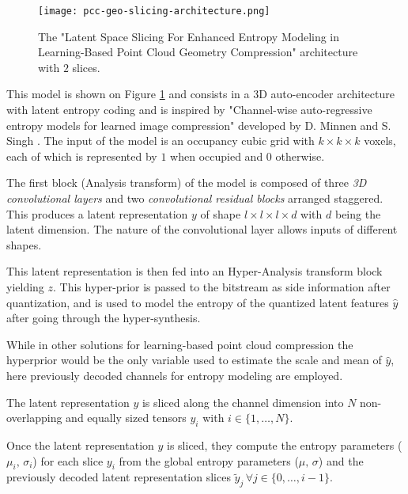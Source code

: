 \begin{figure}[htb]
    \centering
    \texttt{[image: pcc-geo-slicing-architecture.png]}
    \caption{The "Latent Space Slicing For Enhanced Entropy Modeling in Learning-Based Point Cloud Geometry Compression" architecture with $2$ slices.}
    \label{fig:pcc-geo-slicing-architecture}
\end{figure}

This model is shown on Figure \ref{fig:pcc-geo-slicing-architecture} and consists in a 3D auto-encoder architecture with latent entropy coding and is inspired by "Channel-wise auto-regressive entropy models for learned image compression" developed by D. Minnen and S. Singh \cite{bib:2d-pcc-slicing}. 
The input of the model is an occupancy cubic grid with $k \times k \times k$ voxels, each of which is represented by $1$ when occupied and $0$ otherwise. 


The first block (Analysis transform) of the model is composed of three \textit{3D convolutional layers} and two \textit{convolutional residual blocks} arranged staggered. This produces a latent representation $y$ of shape $l \times l \times l \times d$ with $d$ being the latent dimension. The nature of the convolutional layer allows inputs of different shapes. 

This latent representation is then fed into an Hyper-Analysis transform block yielding $z$. This hyper-prior is passed to the bitstream as side information after quantization, and is used to model the entropy of the quantized latent features $\hat{y}$ after going through the hyper-synthesis. 

While in other solutions for learning-based point cloud compression the hyperprior would be the only variable used to estimate the scale and mean of $\hat{y}$, here previously decoded channels for entropy modeling are employed.

The latent representation $y$ is sliced along the channel dimension into $N$ non-overlapping and equally sized tensors $y_i$ with $i \in \{1, \dots, N\}$. 

Once the latent representation $y$ is sliced, they compute the entropy parameters ($\mu_i,\,\sigma_i$) for each slice $y_i$ from the global entropy parameters ($\mu,\,\sigma$) and the previously decoded latent representation slices $\tilde{y}_j\,\forall j \in \{0,\dots,i-1\}$. 

